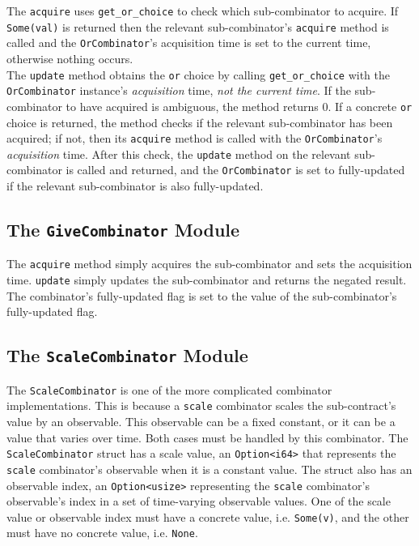 The \texttt{acquire} uses \texttt{get\_or\_choice} to check which sub-combinator to acquire. If \texttt{Some(val)} is returned then the relevant sub-combinator's \texttt{acquire} method is called and the \texttt{OrCombinator}'s acquisition time is set to the current time, otherwise nothing occurs. \\

The \texttt{update} method obtains the \texttt{or} choice by calling \texttt{get\_or\_choice} with the \texttt{OrCombinator} instance's \textit{acquisition} time, \textit{not the current time}. If the sub-combinator to have acquired is ambiguous, the method returns 0. If a concrete \texttt{or} choice is returned, the method checks if the relevant sub-combinator has been acquired; if not, then its \texttt{acquire} method is called with the \texttt{OrCombinator}'s \textit{acquisition} time. After this check, the \texttt{update} method on the relevant sub-combinator is called and returned, and the \texttt{OrCombinator} is set to fully-updated if the relevant sub-combinator is also fully-updated.


\subsection{The \texttt{GiveCombinator} Module}

The \texttt{acquire} method simply acquires the sub-combinator and sets the acquisition time. \texttt{update} simply updates the sub-combinator and returns the negated result. The combinator's fully-updated flag is set to the value of the sub-combinator's fully-updated flag.


\subsection{The \texttt{ScaleCombinator} Module}

The \texttt{ScaleCombinator} is one of the more complicated combinator implementations. This is because a \texttt{scale} combinator scales the sub-contract's value by an observable. This observable can be a fixed constant, or it can be a value that varies over time. Both cases must be handled by this combinator. The \texttt{ScaleCombinator} struct has a scale value, an \texttt{Option<i64>} that represents the \texttt{scale} combinator's observable when it is a constant value.  The struct also has an observable index, an \texttt{Option<usize>} representing the \texttt{scale} combinator's observable's index in a set of time-varying observable values. One of the scale value or observable index must have a concrete value, i.e. \texttt{Some(v)}, and the other must have no concrete value, i.e. \texttt{None}. \\

